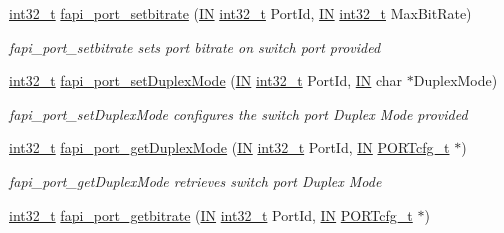 \begin{DoxyCompactItemize}
\hyperlink{commondefs_8h_a32f2e37ee053cf2ce8ca28d1f74630e5}{int32\-\_\-t} \hyperlink{group__FAPI__SYSTEM_ga9509bca2d94e18d442e23e9e53e56229}{fapi\-\_\-port\-\_\-setbitrate} (\hyperlink{group__LIBHELP_gac2bbd6d630a06a980d9a92ddb9a49928}{I\-N} \hyperlink{commondefs_8h_a32f2e37ee053cf2ce8ca28d1f74630e5}{int32\-\_\-t} Port\-Id, \hyperlink{group__LIBHELP_gac2bbd6d630a06a980d9a92ddb9a49928}{I\-N} \hyperlink{commondefs_8h_a32f2e37ee053cf2ce8ca28d1f74630e5}{int32\-\_\-t} Max\-Bit\-Rate)
\begin{DoxyCompactList}\small\item\em fapi\-\_\-port\-\_\-setbitrate sets port bitrate on switch port provided \end{DoxyCompactList}\item 
\hyperlink{commondefs_8h_a32f2e37ee053cf2ce8ca28d1f74630e5}{int32\-\_\-t} \hyperlink{group__FAPI__SYSTEM_ga66a9af52af58601ec1dc5a3c92860ba2}{fapi\-\_\-port\-\_\-set\-Duplex\-Mode} (\hyperlink{group__LIBHELP_gac2bbd6d630a06a980d9a92ddb9a49928}{I\-N} \hyperlink{commondefs_8h_a32f2e37ee053cf2ce8ca28d1f74630e5}{int32\-\_\-t} Port\-Id, \hyperlink{group__LIBHELP_gac2bbd6d630a06a980d9a92ddb9a49928}{I\-N} char $\ast$Duplex\-Mode)
\begin{DoxyCompactList}\small\item\em fapi\-\_\-port\-\_\-set\-Duplex\-Mode configures the switch port Duplex Mode provided \end{DoxyCompactList}\item 
\hyperlink{commondefs_8h_a32f2e37ee053cf2ce8ca28d1f74630e5}{int32\-\_\-t} \hyperlink{group__FAPI__SYSTEM_ga28aeb59cb6408221a34954c82b574840}{fapi\-\_\-port\-\_\-get\-Duplex\-Mode} (\hyperlink{group__LIBHELP_gac2bbd6d630a06a980d9a92ddb9a49928}{I\-N} \hyperlink{commondefs_8h_a32f2e37ee053cf2ce8ca28d1f74630e5}{int32\-\_\-t} Port\-Id, \hyperlink{group__LIBHELP_gac2bbd6d630a06a980d9a92ddb9a49928}{I\-N} \hyperlink{structPORTcfg__t}{P\-O\-R\-Tcfg\-\_\-t} $\ast$)
\begin{DoxyCompactList}\small\item\em fapi\-\_\-port\-\_\-get\-Duplex\-Mode retrieves switch port Duplex Mode \end{DoxyCompactList}\item 
\hyperlink{commondefs_8h_a32f2e37ee053cf2ce8ca28d1f74630e5}{int32\-\_\-t} \hyperlink{group__FAPI__SYSTEM_ga86ccb1987be8e6fe78d3092cd033a400}{fapi\-\_\-port\-\_\-getbitrate} (\hyperlink{group__LIBHELP_gac2bbd6d630a06a980d9a92ddb9a49928}{I\-N} \hyperlink{commondefs_8h_a32f2e37ee053cf2ce8ca28d1f74630e5}{int32\-\_\-t} Port\-Id, \hyperlink{group__LIBHELP_gac2bbd6d630a06a980d9a92ddb9a49928}{I\-N} \hyperlink{structPORTcfg__t}{P\-O\-R\-Tcfg\-\_\-t} $\ast$)

\end{DoxyCompactItemize}
